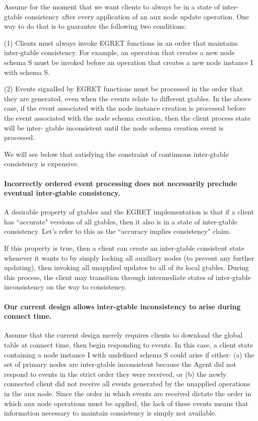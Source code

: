 Assume for the moment that we want clients to always be in a state of
inter-gtable consistency after every application of an aux node update
operation.  One way to do that is to guarantee the following two
conditions:

(1) Clients must always invoke EGRET functions in an order that 
maintains inter-gtable consistency.  For example, an operation that 
creates a new node schema S must be invoked before an operation 
that creates a  new node instance I with schema S.  

(2) Events signalled by EGRET functions must be processed in the 
order that they are generated, even when the events relate to 
different gtables.   In the above case, if the event associated with the 
node instance creation is processed before the event associated with 
the node schema creation, then the client process state will be inter-
gtable inconsistent until the node schema creation event is processed.

We will see below that satisfying the constraint of continuous
inter-gtable consistency is expensive.

\paragraph {Incorrectly ordered event processing does not necessarily preclude
eventual inter-gtable consistency.}

A desirable property of gtables and the EGRET implementation is that
if a client has ``accurate" versions of all gtables, then it also is in
a state of inter-gtable consistency.  Let's refer to this as the
``accuracy implies consistency" claim.

If this property is true, then a client can create an inter-gtable
consistent state whenever it wants to by simply locking all auxiliary
nodes (to prevent any further updating), then invoking all unapplied
updates to all of its local gtables.  During this process, the client
may transition through intermediate states of inter-gtable
inconsistency on the way to consistency.

\paragraph {Our current design allows inter-gtable inconsistency to arise
during connect time.}

Assume that the current design merely requires clients to download 
the global table at connect time, then begin responding to events. In 
this case, a client state containing a node instance I with undefined 
schema S could arise if either: (a) the set of primary nodes are
inter-gtable inconsistent because the Agent did not respond to 
events in the strict order they were received, or (b) the newly 
connected client did not receive all events generated by the 
unapplied operations in the aux node.  Since the order in which 
events are received dictate the order in which aux node operations 
must be applied, the lack of these events means that information
necessary to maintain consistency is simply not available.


